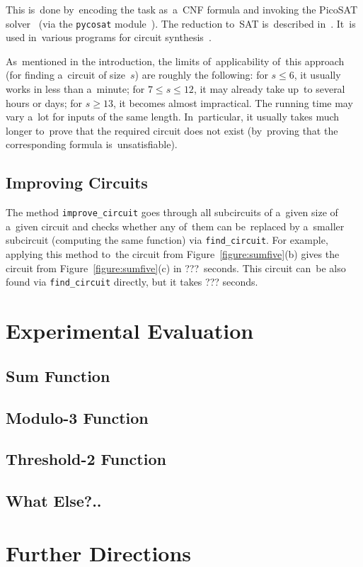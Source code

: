 \documentclass[12pt,letterpaper]{article}
\begin{document}
This is~done by~encoding the task as~a~CNF formula
and invoking the PicoSAT solver~\cite{DBLP:journals/jsat/Biere08} (via the \texttt{pycosat} module~\cite{pycosat}). The reduction to~SAT is~described 
in~\cite{DBLP:conf/sat/KojevnikovKY09}. It~is used
in~various programs for circuit synthesis~\cite{reduction, abc}.

As~mentioned in the introduction, the limits 
of~applicability of~this approach (for finding a~circuit of size~$s$) are roughly the following:
for $s \le 6$, it usually works in less than a~minute;
for $7 \le s \le 12$, it may already take up~to 
several hours or days; for $s \ge 13$, it becomes almost impractical. The running time may vary a~lot
for inputs of the same length. In~particular,
it usually takes much longer to~prove that 
the required circuit does not exist (by~proving that the corresponding formula is~unsatisfiable).


\subsection{Improving Circuits}
The method \texttt{improve_circuit}
goes through all subcircuits of a~given size
of a~given circuit and checks whether any 
of~them can be~replaced by a~smaller subcircuit 
(computing the same function) via \texttt{find_circuit}. For example, applying this method 
to~the circuit from Figure~\ref{figure:sumfive}(b)
gives the circuit from Figure~\ref{figure:sumfive}(c)
in ???~seconds. This circuit can~be also found via \texttt{find_circuit} directly, but it takes ??? seconds.





\section{Experimental Evaluation}


\subsection{Sum Function}

\subsection{Modulo-3 Function}

\subsection{Threshold-2 Function}

\subsection{What Else?..}

\section{Further Directions}



\end{document}
